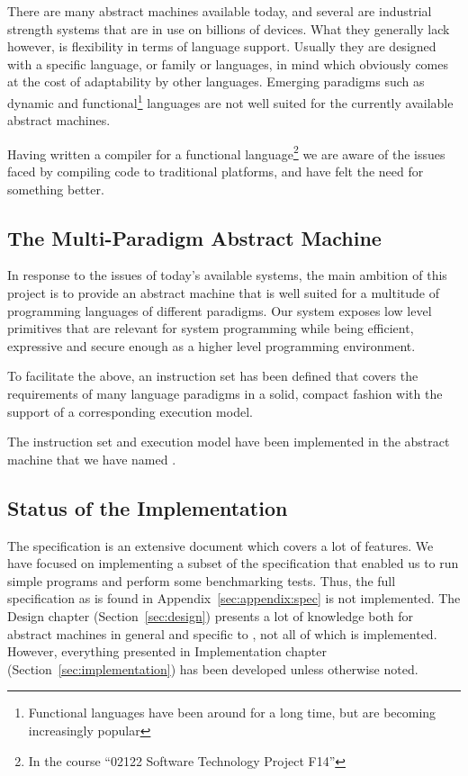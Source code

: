 There are many abstract machines available today, and several are industrial
strength systems that are in use on billions of devices. What they generally
lack however, is flexibility in terms of language support. Usually they are
designed with a specific language, or family or languages, in mind which
obviously comes at the cost of adaptability by other languages. Emerging
paradigms such as dynamic and functional\footnote{Functional languages have been
  around for a long time, but are becoming increasingly popular} languages are
not well suited for the currently available abstract machines.

Having written a compiler for a functional language\footnote{In the course
  ``02122 Software Technology Project F14''} we are aware of the issues faced by
compiling code to traditional platforms, and have felt the need for something
better.

\subsection{The Multi-Paradigm Abstract Machine}

In response to the issues of today's available systems, the main ambition of
this project is to provide an abstract machine that is well suited for a
multitude of programming languages of different paradigms. Our system exposes
low level primitives that are relevant for system programming while being
efficient, expressive and secure enough as a higher level programming
environment.

To facilitate the above, an instruction set has been defined that covers the
requirements of many language paradigms in a solid, compact fashion with the
support of a corresponding execution model.

The instruction set and execution model have been implemented in the abstract
machine that we have named \thename{}.

\subsection{Status of the Implementation}

The \thename{} specification is an extensive document which covers a lot of
features. We have focused on implementing a subset of the specification that
enabled us to run simple programs and perform some benchmarking tests. Thus, the
full specification as is found in Appendix~\ref{sec:appendix:spec} is not
implemented. The Design chapter (Section~\ref{sec:design}) presents a lot of
knowledge both for abstract machines in general and specific to \thename{}, not
all of which is implemented. However, everything presented in Implementation
chapter (Section~\ref{sec:implementation}) has been developed unless otherwise
noted.

